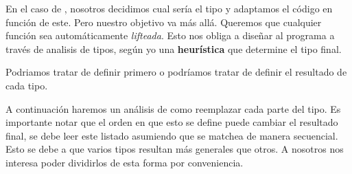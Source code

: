 En el caso de , nosotros decidimos cual sería el tipo y adaptamos el
código en función de este. Pero nuestro objetivo va más allá. Queremos que
cualquier función sea automáticamente \textit{lifteada}. Esto nos obliga a
diseñar al programa a través de analisis de tipos, según yo una
\textbf{heurística} que determine el tipo final.

Podriamos tratar de definir  primero o podríamos tratar de definir el
resultado de cada tipo.

A continuación haremos un análisis de como reemplazar cada parte del tipo. Es
importante notar que el orden en que esto se define puede cambiar el resultado
final, se debe leer este listado asumiendo que se matchea de manera secuencial.
Esto se debe a que varios tipos resultan más generales que otros. A nosotros nos
interesa poder dividirlos de esta forma por conveniencia.

